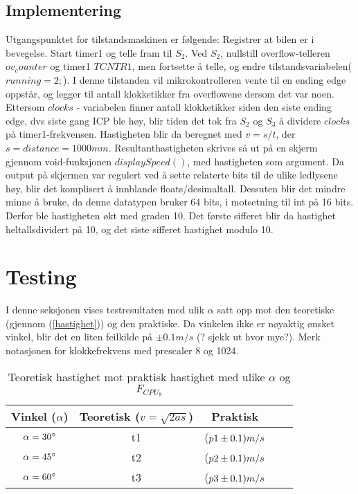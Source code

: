 \documentclass[11pt, a4paper]{article}
\begin{document}
\subsection{Implementering}
Utgangspunktet for tilstandsmaskinen er følgende: Registrer at bilen er i bevegelse. Start timer1 og telle fram til $S_{2}$. Ved $S_{2}$, nullstill overflow-telleren $ov_counter$ og timer1 $TCNTR1$, men fortsette å telle, og endre tilstandsvariabelen($running = 2;$). I denne tilstanden vil mikrokontrolleren vente til en ending edge oppstår, og legger til antall klokketikker fra overflowene dersom det var noen. Ettersom $clocks$ - variabelen finner antall klokketikker siden den siste ending edge, dvs siste gang ICP ble høy, blir tiden det tok fra $S_{2}$ og $S_{3}$ å dividere $clocks$ på timer1-frekvensen. Hastigheten blir da beregnet med $v = s/t$, der $ s = distance = 1000mm$. \newline
%
Resultanthastigheten skrives så ut på en skjerm gjennom void-funksjonen $displaySpeed()$, med hastigheten som argument. Da output på skjermen var regulert ved å sette relaterte bits til de ulike ledlysene høy, blir det komplisert å innblande floats/desimaltall. Dessuten blir det mindre minne å bruke, da denne datatypen bruker 64 bits, i motsetning til int på 16 bits. Derfor ble hastigheten økt med graden 10. Det første sifferet blir da hastighet heltallsdividert på 10, og det siste sifferet hastighet modulo 10. 


\section{Testing}
I denne seksjonen vises testresultaten med ulik $\alpha$ satt opp mot den teoretiske (gjennom (\ref{hastighet})) og den praktiske. Da vinkelen ikke er nøyaktig ønsket vinkel, blir det en liten feilkilde på $\pm 0.1m/s$ (? sjekk ut hvor mye?). Merk notasjonen for klokkefrekvens med prescaler 8 og 1024. 

\begin{table}[h]
\caption{Teoretisk hastighet mot praktisk hastighet med ulike $\alpha$ og $F_{CPU_{8}}$}
\begin{center}
\begin{tabular}{ccccc}
\hline
Vinkel ($\alpha$)  & Teoretisk ($ v =\sqrt{2as}$) &  Praktisk\\
\hline

$\alpha = 30^{\circ}\rm$ & t1 & ($p1 \pm 0.1) m/s \rm$\\

$\alpha = 45^{\circ}\rm$ & t2 & ($p2 \pm 0.1) m/s \rm $ \\

$\alpha = 60^{\circ}\rm$ & t3 & ($p3 \pm 0.1) m/s \rm $ \\

\hline

\end{tabular}
\end{center}
\end{table}
\end{document}
